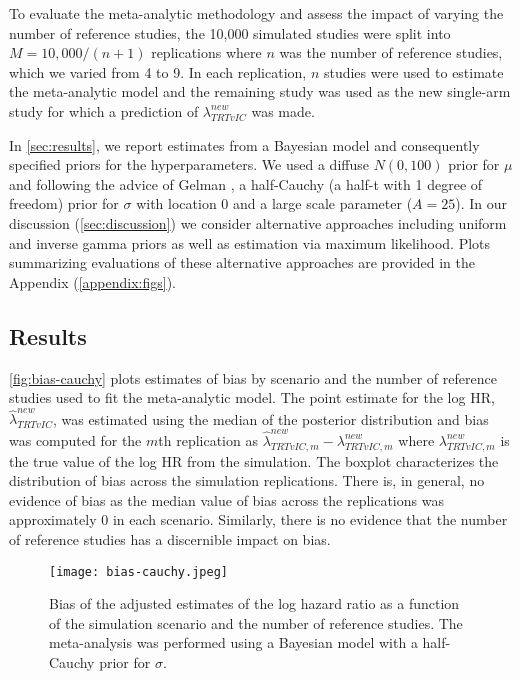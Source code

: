 \documentclass[11pt,final,fleqn]{article}\usepackage[]{graphicx}\usepackage[]{color}
\begin{document}
To evaluate the meta-analytic methodology and assess the impact of varying the number of reference studies, the 10,000 simulated studies were split into $M=10,000/(n+1)$ replications where $n$ was the number of reference studies, which we varied from 4 to 9. In each replication, $n$ studies were used to estimate the meta-analytic model and the remaining study was used as the new single-arm study for which a prediction of $\lambda^{new}_{\textit{TRT}vIC}$ was made. 

In \autoref{sec:results}, we report estimates from a Bayesian model and consequently specified priors for the hyperparameters. We used a diffuse $N(0, 100)$ prior for $\mu$ and following the advice of Gelman \cite{gelman2006prior}, a half-Cauchy (a half-t with 1 degree of freedom) prior for $\sigma$ with location $0$ and a large scale parameter ($A = 25$). In our discussion (\autoref{sec:discussion}) we consider alternative approaches including uniform and inverse gamma priors as well as estimation via maximum likelihood. Plots summarizing evaluations of these alternative approaches are provided in the Appendix (\autoref{appendix:figs}).

\subsection{Results} \label{sec:results}
\autoref{fig:bias-cauchy} plots estimates of bias by scenario and the number of reference studies used to fit the meta-analytic model. The point estimate for the log HR, $\hat{\lambda}^{new}_{\textit{TRT}vIC}$, was estimated using the median of the posterior distribution and bias was computed for the $m$th replication as $\hat{\lambda}^{new}_{\textit{TRT}vIC,m} - \lambda^{new}_{\textit{TRT}vIC,m}$ where $\lambda^{new}_{\textit{TRT}vIC,m}$ is the true value of the log HR from the simulation. The boxplot characterizes the distribution of bias across the simulation replications. There is, in general, no evidence of bias as the median value of bias across the replications was approximately 0 in each scenario. Similarly, there is no evidence that the number of reference studies has a discernible impact on bias. 

\begin{figure}[t!]
\centering
\texttt{[image: bias-cauchy.jpeg]} 
\caption{Bias of the adjusted estimates of the log hazard ratio as a function of the simulation scenario and the number of reference studies. The meta-analysis was performed using a Bayesian model with a half-Cauchy prior for $\sigma$.}
\label{fig:bias-cauchy}
\end{figure}
\end{document}
